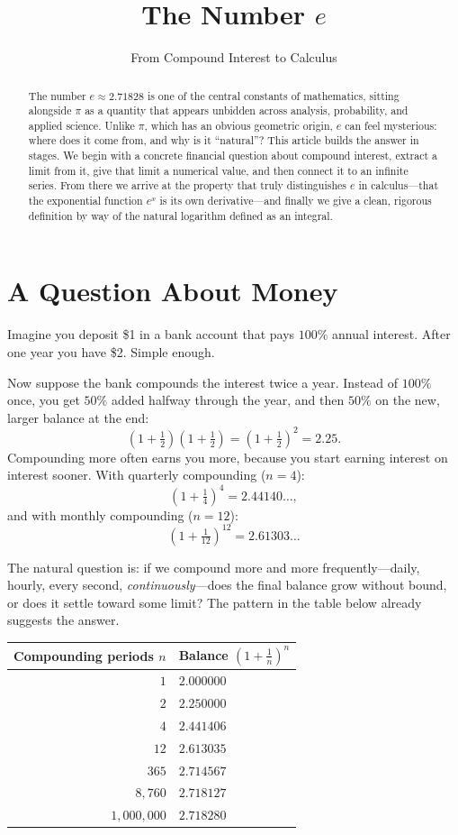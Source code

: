 \documentclass{essay}
\title{The Number $e$}
\subtitle{From Compound Interest to Calculus}
\author{}
\date{}
\begin{document}
\maketitle

\begin{abstract}
\noindent The number $e \approx 2.71828$ is one of the central constants of mathematics, sitting alongside $\pi$ as a quantity that appears unbidden across analysis, probability, and applied science. Unlike $\pi$, which has an obvious geometric origin, $e$ can feel mysterious: where does it come from, and why is it ``natural''? This article builds the answer in stages. We begin with a concrete financial question about compound interest, extract a limit from it, give that limit a numerical value, and then connect it to an infinite series. From there we arrive at the property that truly distinguishes $e$ in calculus---that the exponential function $e^x$ is its own derivative---and finally we give a clean, rigorous definition by way of the natural logarithm defined as an integral.
\end{abstract}

\section{A Question About Money}

Imagine you deposit \$1 in a bank account that pays $100\%$ annual interest. After one year you have \$2. Simple enough.

Now suppose the bank compounds the interest twice a year. Instead of $100\%$ once, you get $50\%$ added halfway through the year, and then $50\%$ on the new, larger balance at the end:
\[
\left(1 + \tfrac{1}{2}\right)\left(1 + \tfrac{1}{2}\right) = \left(1 + \tfrac{1}{2}\right)^2 = 2.25.
\]
Compounding more often earns you more, because you start earning interest on interest sooner. With quarterly compounding ($n = 4$):
\[
\left(1 + \tfrac{1}{4}\right)^4 = 2.44140\ldots,
\]
and with monthly compounding ($n = 12$):
\[
\left(1 + \tfrac{1}{12}\right)^{12} = 2.61303\ldots
\]

The natural question is: if we compound more and more frequently---daily, hourly, every second, \emph{continuously}---does the final balance grow without bound, or does it settle toward some limit? The pattern in the table below already suggests the answer.

\begin{center}
\begin{tabular}{rl}
\hline
Compounding periods $n$ & Balance $\left(1 + \tfrac{1}{n}\right)^n$ \\
\hline
$1$ & $2.000000$ \\
$2$ & $2.250000$ \\
$4$ & $2.441406$ \\
$12$ & $2.613035$ \\
$365$ & $2.714567$ \\
$8{,}760$ & $2.718127$ \\
$1{,}000{,}000$ & $2.718280$ \\
\hline
\end{tabular}
\end{center}
\end{document}
